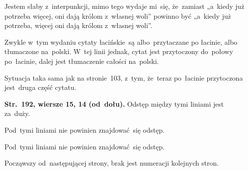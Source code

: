 \documentclass[a4paper,11pt]{article}
\begin{document}
\vspace{\spaceFour}





\noindent
{} Jestem słaby z~interpunkcji, mimo tego wydaje
mi~się, że~zamiast „a~kiedy już potrzeba więcej, oni dają królom
z~własnej woli” powinno być „a~kiedy już potrzeba, więcej oni dają
królom z~własnej woli”.

\vspace{\spaceFour}





\noindent
{} Zwykle w~tym wydaniu cytaty łacińskie~są albo~przytaczane
po łacinie, albo tłumaczone na~polski. W~tej linii jednak, cytat jest
przytoczony do~połowy po~łacinie, dalej jest tłumaczenie całości na~polski.

\vspace{\spaceFour}





\noindent
{} Sytuacja taka sama jak na stronie~103, z~tym, że~teraz
po~łacinie przytoczona jest~druga część cytatu.

\vspace{\spaceFour}





\noindent
\textbf{Str.~192, wiersze 15, 14 (od~dołu).} Odstęp między tymi
liniami jest za~duży.

\vspace{\spaceFour}





\noindent
{} Pod~tymi liniami nie powinien znajdować~się odstęp.

\vspace{\spaceFour}





\noindent
{} Pod~tymi liniami nie powinien znajdować~się odstęp.

\vspace{\spaceFour}





\noindent
{} Począwszy od~następującej strony, brak jest numeracji kolejnych
stron.

\vspace{\spaceFour}
\end{document}
